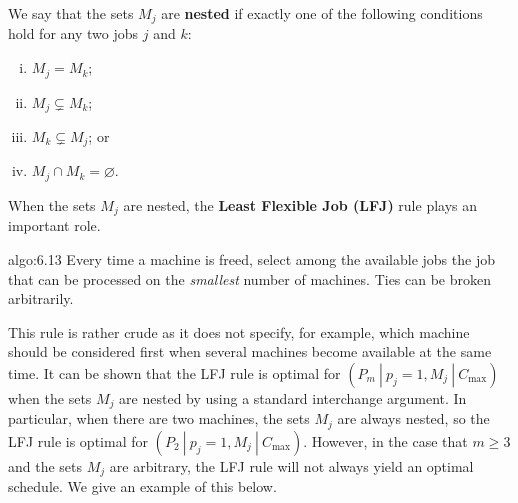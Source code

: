 We say that the sets $M_j$ are {\bf nested} if exactly one of the 
following conditions hold for any two jobs $j$ and $k$: 
\begin{enumerate}[(i)]
    \item $M_j = M_k$; 
    \item $M_j \subsetneq M_k$;
    \item $M_k \subsetneq M_j$; or 
    \item $M_j \cap M_k = \varnothing$.
\end{enumerate} 
When the sets $M_j$ are nested, the {\bf Least Flexible Job (LFJ)} rule 
plays an important role. 

\begin{algo}{algo:6.13}
    Every time a machine is freed, select among the available jobs the job 
    that can be processed on the \emph{smallest} number of machines. Ties 
    can be broken arbitrarily. 
\end{algo}

This rule is rather crude as it does not specify, for example, which
machine should be considered first when several machines become available at
the same time. It can be shown that the LFJ rule is optimal for 
$(P_m~|~p_j=1, M_j~|~C_{\max})$ when the sets $M_j$ are nested by using 
a standard interchange argument. In particular, when there are two 
machines, the sets $M_j$ are always nested, so the LFJ rule is optimal 
for $(P_2~|~p_j=1, M_j~|~C_{\max})$. However, in the case that $m \geq 3$ 
and the sets $M_j$ are arbitrary, the LFJ rule will not always yield an 
optimal schedule. We give an example of this below. 

